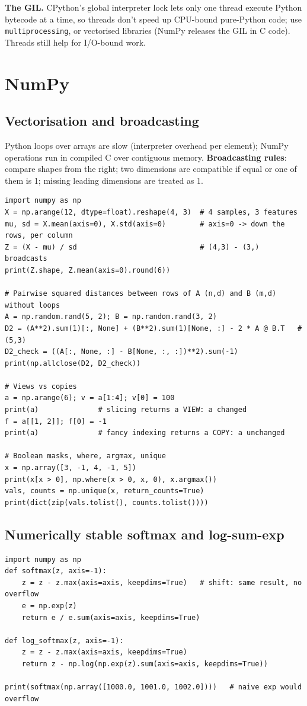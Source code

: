 \textbf{The GIL.} CPython's global interpreter lock lets only one thread execute Python bytecode at a time, so threads don't speed up CPU-bound pure-Python code; use \texttt{multiprocessing}, or vectorised libraries (NumPy releases the GIL in C code). Threads still help for I/O-bound work.

\section{NumPy}

\subsection{Vectorisation and broadcasting}
Python loops over arrays are slow (interpreter overhead per element); NumPy operations run in compiled C over contiguous memory. \textbf{Broadcasting rules}: compare shapes from the right; two dimensions are compatible if equal or one of them is 1; missing leading dimensions are treated as 1.

\begin{lstlisting}[style=python]
import numpy as np
X = np.arange(12, dtype=float).reshape(4, 3)  # 4 samples, 3 features
mu, sd = X.mean(axis=0), X.std(axis=0)        # axis=0 -> down the rows, per column
Z = (X - mu) / sd                             # (4,3) - (3,) broadcasts
print(Z.shape, Z.mean(axis=0).round(6))

# Pairwise squared distances between rows of A (n,d) and B (m,d) without loops
A = np.random.rand(5, 2); B = np.random.rand(3, 2)
D2 = (A**2).sum(1)[:, None] + (B**2).sum(1)[None, :] - 2 * A @ B.T   # (5,3)
D2_check = ((A[:, None, :] - B[None, :, :])**2).sum(-1)
print(np.allclose(D2, D2_check))

# Views vs copies
a = np.arange(6); v = a[1:4]; v[0] = 100
print(a)              # slicing returns a VIEW: a changed
f = a[[1, 2]]; f[0] = -1
print(a)              # fancy indexing returns a COPY: a unchanged

# Boolean masks, where, argmax, unique
x = np.array([3, -1, 4, -1, 5])
print(x[x > 0], np.where(x > 0, x, 0), x.argmax())
vals, counts = np.unique(x, return_counts=True)
print(dict(zip(vals.tolist(), counts.tolist())))
\end{lstlisting}

\subsection{Numerically stable softmax and log-sum-exp}
\begin{lstlisting}[style=python]
import numpy as np
def softmax(z, axis=-1):
    z = z - z.max(axis=axis, keepdims=True)   # shift: same result, no overflow
    e = np.exp(z)
    return e / e.sum(axis=axis, keepdims=True)

def log_softmax(z, axis=-1):
    z = z - z.max(axis=axis, keepdims=True)
    return z - np.log(np.exp(z).sum(axis=axis, keepdims=True))

print(softmax(np.array([1000.0, 1001.0, 1002.0])))   # naive exp would overflow
\end{lstlisting}

